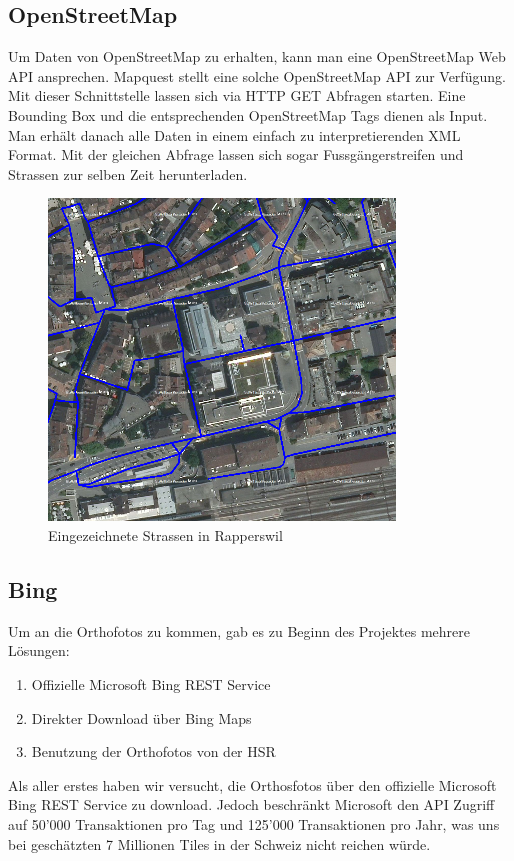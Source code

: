 \subsection{OpenStreetMap}
Um Daten von OpenStreetMap zu erhalten, kann man eine OpenStreetMap Web API ansprechen. Mapquest \cite{Mapquest} stellt eine solche OpenStreetMap API zur Verfügung. Mit dieser Schnittstelle lassen sich via HTTP GET Abfragen starten. Eine Bounding Box und die entsprechenden OpenStreetMap Tags dienen als Input. Man erhält danach alle Daten in einem einfach zu interpretierenden XML Format. Mit der gleichen Abfrage lassen sich sogar Fussgängerstreifen und Strassen zur selben Zeit herunterladen. \\

\begin{figure}[H]
	\centering
	\includegraphics{images/Strassen_Rapperswil.png}
	\caption{Eingezeichnete Strassen in Rapperswil}
\end{figure}

\newpage
\subsection{Bing}
Um an die Orthofotos zu kommen, gab es zu Beginn des Projektes mehrere Lösungen:
\begin{enumerate}
	\item Offizielle Microsoft Bing REST Service
	\item Direkter Download über Bing Maps
	\item Benutzung der Orthofotos von der HSR
\end{enumerate}

Als aller erstes haben wir versucht, die Orthosfotos über den offizielle Microsoft Bing REST Service \cite{BingMapsRest} zu download. Jedoch beschränkt Microsoft den API Zugriff auf 50'000 Transaktionen pro Tag und 125'000 Transaktionen pro Jahr, was uns bei geschätzten 7 Millionen Tiles in der Schweiz nicht reichen würde.

